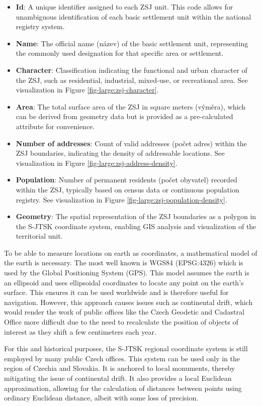 \begin{itemize}
    \item \textbf{Id}: A unique identifier assigned to each ZSJ unit. This code allows for unambiguous identification of each basic settlement unit within the national registry system.
    \item \textbf{Name}: The official name (název) of the basic settlement unit, representing the commonly used designation for that specific area or settlement.
    \item \textbf{Character}: Classification indicating the functional and urban character of the ZSJ, such as residential, industrial, mixed-use, or recreational area. See visualization in Figure \ref{fig-large:zsj-character}.
    \item \textbf{Area}: The total surface area of the ZSJ in square meters (výměra), which can be derived from geometry data but is provided as a pre-calculated attribute for convenience.
    \item \textbf{Number of addresses}: Count of valid addresses (počet adres) within the ZSJ boundaries, indicating the density of addressable locations. See visualization in Figure \ref{fig-large:zsj-address-density}.
    \item \textbf{Population}: Number of permanent residents (počet obyvatel) recorded within the ZSJ, typically based on census data or continuous population registry. See visualization in Figure \ref{fig-large:zsj-population-density}.
    \item \textbf{Geometry}: The spatial representation of the ZSJ boundaries as a polygon in the S-JTSK coordinate system, enabling GIS analysis and visualization of the territorial unit.
\end{itemize}

\begin{kaobox}[frametitle=Coordinate reference system - WGS84 and S-JTSK coordinate system]
    To be able to measure locations on earth as coordinates, a mathematical model of the earth is necessary. The most well known is WGS84 (EPSG:4326)  which is used by the Global Positioning System (GPS). This model assumes the earth is an ellipsoid and uses ellipsoidal coordinates to locate any point on the earth's surface. This ensures it can be used worldwide and is therefore useful for navigation. However, this approach causes issues such as continental drift, which would render the work of public offices like the Czech Geodetic and Cadastral Office more difficult due to the need to recalculate the position of objects of interest as they shift a few centimeters each year.

    For this and historical purposes, the S-JTSK  regional coordinate system is still employed by many public Czech offices. This system can be used only in the region of Czechia and Slovakia. It is anchored to local monuments, thereby mitigating the issue of continental drift. It also provides a local Euclidean approximation, allowing for the calculation of distances between points using ordinary Euclidean distance, albeit with some loss of precision.
\end{kaobox}

